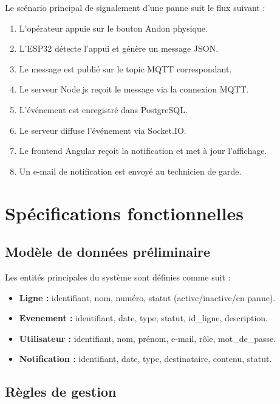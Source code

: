 Le sc\'enario principal de signalement d'une panne suit le flux suivant :

\begin{enumerate}
    \item L'op\'erateur appuie sur le bouton Andon physique.
    \item L'ESP32 d\'etecte l'appui et g\'en\`ere un message JSON.
    \item Le message est publi\'e sur le topic MQTT correspondant.
    \item Le serveur Node.js re\c{c}oit le message via la connexion MQTT.
    \item L'\'ev\'enement est enregistr\'e dans PostgreSQL.
    \item Le serveur diffuse l'\'ev\'enement via Socket.IO.
    \item Le frontend Angular re\c{c}oit la notification et met \`a jour l'affichage.
    \item Un e-mail de notification est envoy\'e au technicien de garde.
\end{enumerate}

\section{Sp\'ecifications fonctionnelles}

\subsection{Mod\`ele de donn\'ees pr\'eliminaire}

Les entit\'es principales du syst\`eme sont d\'efinies comme suit :

\begin{itemize}
    \item \textbf{Ligne :} identifiant, nom, num\'ero, statut (active/inactive/en panne).
    \item \textbf{Evenement :} identifiant, date, type, statut, id\_ligne, description.
    \item \textbf{Utilisateur :} identifiant, nom, pr\'enom, e-mail, r\^ole, mot\_de\_passe.
    \item \textbf{Notification :} identifiant, date, type, destinataire, contenu, statut.
\end{itemize}

\subsection{R\`egles de gestion}

